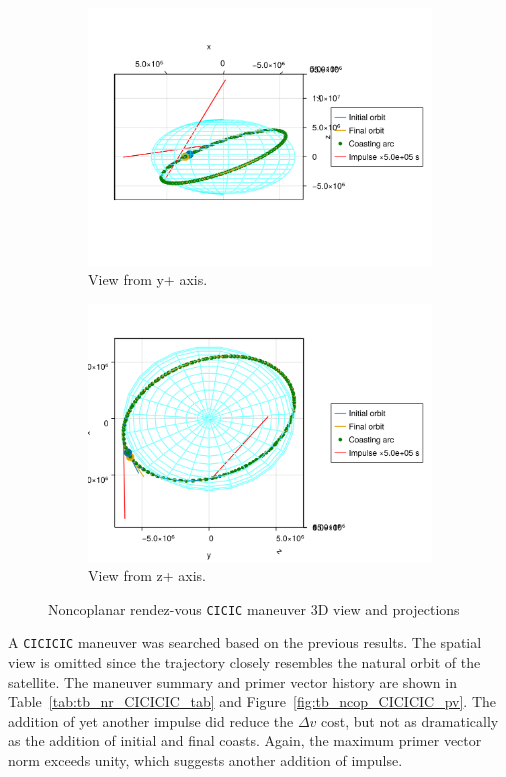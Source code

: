\begin{figure}[htbp]
\begin{subfigure}{0.49\linewidth}
        \includegraphics[width=\linewidth]{../results/two_body/ipv_noncop/CICIC_y+.png}
        \caption{View from y+ axis.}
    \end{subfigure}
    \begin{subfigure}{0.49\linewidth}
        \includegraphics[width=\linewidth]{../results/two_body/ipv_noncop/CICIC_z+.png}
        \caption{View from z+ axis.}
    \end{subfigure}
    \caption{Noncoplanar rendez-vous \texttt{CICIC} maneuver 3D view and projections}
    \label{fig:tb_ncop_CICIC_figs}
\end{figure}

A \texttt{CICICIC} maneuver was searched based on the previous results. The spatial view is omitted since the trajectory closely resembles the natural orbit of the satellite. The maneuver summary and primer vector history are shown in Table~\ref{tab:tb_nr_CICICIC_tab} and Figure~\ref{fig:tb_ncop_CICICIC_pv}. The addition of yet another impulse did reduce the \(\Delta v\) cost, but not as dramatically as the addition of initial and final coasts. Again, the maximum primer vector norm exceeds unity, which suggests another addition of impulse.

